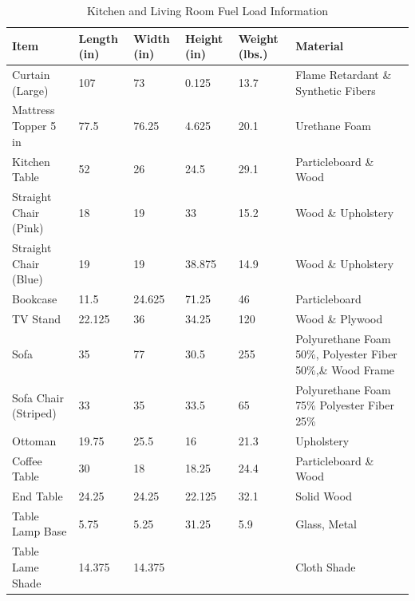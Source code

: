 \begin{table}[H]
\centering
\begin{tabular}{|L{0.23\textwidth}|C{0.08\textwidth}|C{0.08\textwidth}|C{0.08\textwidth}|C{0.08\textwidth}|L{0.25\textwidth}|}
\hline
Item 								&Length (in) 	&Width (in) 	&Height (in) 	&Weight (lbs.) 	&Material \\ \hline \hline
Curtain (Large) 					&107 			&73 			&0.125 			&13.7 			&Flame Retardant \& Synthetic Fibers \\ \hline
Mattress Topper 5 in 				&77.5 			&76.25 			&4.625 			&20.1  			&Urethane Foam \\ \hline
Kitchen Table 						&52 			&26 			&24.5 			&29.1 			&Particleboard \& Wood \\ \hline
Straight Chair (Pink) 				&18 			&19 			&33 			&15.2 			&Wood \& Upholstery \\ \hline
Straight Chair (Blue) 				&19 			&19 			&38.875 		&14.9 			&Wood \& Upholstery \\ \hline
Bookcase 							&11.5 			&24.625 		&71.25 			&46 			&Particleboard \\ \hline
TV Stand 							&22.125 		&36 			&34.25 			&120 			&Wood \& Plywood \\ \hline
Sofa 								&35 			&77 			&30.5 			&255 			&Polyurethane Foam 50\%, Polyester Fiber 50\%,\& Wood Frame \\ \hline
Sofa Chair (Striped) 				&33 			&35 			&33.5 			&65 			&Polyurethane Foam 75\% Polyester Fiber 25\% \\ \hline
Ottoman 							&19.75 			&25.5 			&16 			&21.3 			&Upholstery \\ \hline
Coffee Table 			 			&30 			&18 			&18.25 			&24.4 			&Particleboard \& Wood \\ \hline
End Table 			 				&24.25 			&24.25 			&22.125 		&32.1 			&Solid Wood \\ \hline
Table Lamp Base 					&5.75 			&5.25 			&31.25 			&5.9 			&Glass, Metal  \\ \hline
Table Lame Shade 					&14.375 		&14.375 		&  				&  				&Cloth Shade \\ \hline 
\end{tabular}
\caption{Kitchen and Living Room Fuel Load Information}
\label{table:k_lv_fuel_weights}
\end{table}

